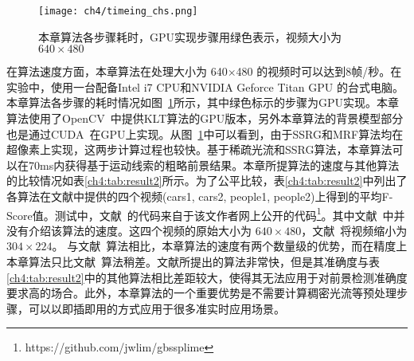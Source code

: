 \begin{figure}[!htbp]
\begin{center}
  \texttt{[image: ch4/timeing\_chs.png]}

\end{center}

\caption{本章算法各步骤耗时，GPU实现步骤用绿色表示，视频大小为 $640\times480$}
\label{ch4:fig:timing}       %
\end{figure}
在算法速度方面，本章算法在处理大小为 640$\times$480 的视频时可以达到8帧/秒。在实验中，使用一台配备Intel i7 CPU和NVIDIA Geforce Titan GPU 的台式电脑。本章算法各步骤的耗时情况如图~\ref{ch4:fig:timing}所示，其中绿色标示的步骤为GPU实现。本章算法使用了OpenCV~\cite{opencv_library}中提供KLT算法的GPU版本，另外本章算法的背景模型部分也是通过CUDA~\cite{CUDA}在GPU上实现。从图~\ref{ch4:fig:timing}中可以看到，由于SSRG和MRF算法均在超像素上实现，这两步计算过程也较快。基于稀疏光流和SSRG算法，本章算法可以在70ms内获得基于运动线索的粗略前景结果。本章所提算法的速度与其他算法的比较情况如表\ref{ch4:tab:result2}所示。为了公平比较，表\ref{ch4:tab:result2}中列出了各算法在文献中提供的四个视频(cars1, cars2, people1, people2)上得到的平均F-Score值。测试中，文献~的代码来自于该文作者网上公开的代码\footnote{https://github.com/jwlim/gbssplime}。其中文献~中并没有介绍该算法的速度。这四个视频的原始大小为 $640\times480$，文献~将视频缩小为$304\times224$。 与文献~算法相比，本章算法的速度有两个数量级的优势，而在精度上本章算法只比文献~算法稍差。文献所提出的算法非常快，但是其准确度与表\ref{ch4:tab:result2}中的其他算法相比差距较大，使得其无法应用于对前景检测准确度要求高的场合。此外，本章算法的一个重要优势是不需要计算稠密光流等预处理步骤，可以以即插即用的方式应用于很多准实时应用场景。
